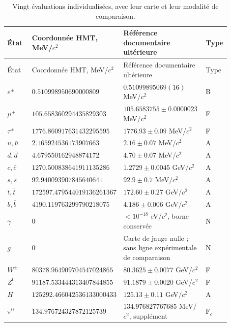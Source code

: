 \begingroup
\small
\setlength{\tabcolsep}{3pt}
\begin{longtable}{p{0.13\linewidth}p{0.32\linewidth}p{0.38\linewidth}p{0.07\linewidth}}
\caption{Vingt évaluations individualisées, avec leur carte et leur modalité de comparaison.}
\label{vi:tab:vi-evaluaciones-veinte}\\
\toprule
État & Coordonnée HMT, MeV/\(c^2\) & Référence documentaire ultérieure & Type\\
\midrule
\endfirsthead
\toprule
État & Coordonnée HMT, MeV/\(c^2\) & Référence documentaire ultérieure & Type\\
\midrule
\endhead
\bottomrule
\endfoot
\(e^\pm\) & \(0.510998950\allowbreak690000809\) & \(0.51099895069(16)\) MeV/\(c^2\) & B\\
\(\mu^\pm\) & \(105.658360294\allowbreak435829303\) & \(105.6583755\pm0.0000023\) MeV/\(c^2\) & F\\
\(\tau^\pm\) & \(1776.860917631\allowbreak432295595\) & \(1776.93\pm0.09\) MeV/\(c^2\) & F\\
\(u,\bar u\) & \(2.165924536\allowbreak173907663\) & \(2.16\pm0.07\) MeV/\(c^2\) & A\\
\(d,\bar d\) & \(4.679550162\allowbreak948874172\) & \(4.70\pm0.07\) MeV/\(c^2\) & A\\
\(c,\bar c\) & \(1270.500838641\allowbreak911135286\) & \(1.2729\pm0.0045\) GeV/\(c^2\) & A\\
\(s,\bar s\) & \(92.940093907\allowbreak845640641\) & \(92.9\pm0.7\) MeV/\(c^2\) & A\\
\(t,\bar t\) & \(172597.479544019\allowbreak136261367\) & \(172.60\pm0.27\) GeV/\(c^2\) & A\\
\(b,\bar b\) & \(4190.119763299\allowbreak790218075\) & \(4.186\pm0.006\) GeV/\(c^2\) & A\\
\(\gamma\) & \(0\) & \(<10^{-18}\) eV/\(c^2\), borne conservée & N\\
\(g\) & \(0\) & Carte de jauge nulle ; sans ligne expérimentale de comparaison & N\\
\(W^\pm\) & \(80378.964909704\allowbreak547024865\) & \(80.3625\pm0.0077\) GeV/\(c^2\) & F\\
\(Z^0\) & \(91187.533444313\allowbreak407844855\) & \(91.1879\pm0.0020\) GeV/\(c^2\) & F\\
\(H\) & \(125292.466042536\allowbreak133000433\) & \(125.13\pm0.11\) GeV/\(c^2\) & A\\
\(\pi^0\) & \(134.976724327\allowbreak872125739\) & \(134.976827767685\) MeV/\(c^2\), supplément & \(\mathrm F_c\)\\

\end{longtable}
